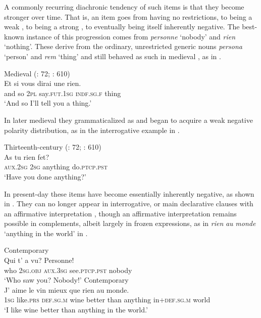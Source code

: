\documentclass[output=paper]{langsci/langscibook}
\begin{document}
A commonly recurring diachronic tendency of such items is that they become stronger over time. That is, an item goes from having no restrictions, to being a weak , to being a strong , to eventually being itself inherently negative. The best-known instance of this progression comes from  \textit{personne} ‘nobody’ and \textit{rien} ‘nothing’. These derive from the ordinary, unrestricted  generic nouns \textit{persona} ‘person’ and \textit{rem} ‘thing’ and still behaved as such in medieval , as in .


\ea\label{med}
{       {Medieval}  (\citealt{Hansen2013}: 72; \citealt{Buridant2000}: 610)} \\
\gll Et si vous dirai une rien.\\
     and so \textsc{2pl} say.\textsc{fut.1sg} \textsc{indf.sg.f} thing\\
\glt ‘And so I’ll tell you a thing.’
\z

In later medieval  they grammaticalized as  and began to acquire a weak negative polarity distribution, as in the interrogative example in .

\ea\label{c13}
{Thirteenth-century  (\citealt{Hansen2013}: 72; \citealt{Buridant2000}: 610)} \\
\gll As tu rien fet?\\
     \textsc{aux.2sg} \textsc{2sg} anything do.\textsc{ptcp.pst}\\
\glt ‘Have you done anything?’
\z

In present-day  these items have become essentially inherently negative, as shown in . They can no longer appear in interrogative,  or main declarative clauses with an affirmative interpretation \citep[73]{Hansen2013}, though an affirmative interpretation remains possible in  complements, albeit largely in frozen expressions, as in \textit{rien} \textit{au} \textit{monde} ‘anything in the world’ in .

\ea\label{cont}
{       Contemporary  \citep[68]{Hansen2013}} \\
\gll Qui t’ a vu? Personne!\\
     who 2\textsc{sg.obj} \textsc{aux.3sg} see.\textsc{ptcp.pst} nobody\\
\glt ‘Who saw you? Nobody!’
\ex \label{cont1}
{       Contemporary  \citep[73]{Hansen2013}} \\
\gll J’ aime le vin mieux que rien au monde.\\
     \textsc{1sg} like.\textsc{prs} \textsc{def.sg.m} wine better than anything in+\textsc{def.sg.m} world\\
\glt ‘I like wine better than anything in the world.’
\z
\end{document}
